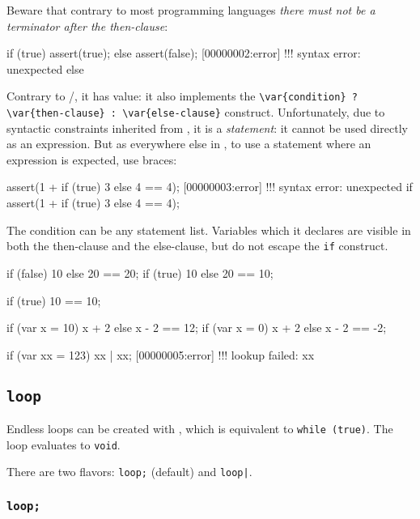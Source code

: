 Beware that contrary to most programming languages \emph{there must not be a
  terminator after the then-clause}:

\begin{urbiscript}
if (true)
  assert(true);
else
  assert(false);
[00000002:error] !!! syntax error: unexpected else
\end{urbiscript}

Contrary to \langC/\Cxx, it has value: it also implements the
\lstinline|\var{condition} ? \var{then-clause} : \var{else-clause}|
construct.  Unfortunately, due to syntactic constraints inherited from \langC,
it is a \emph{statement}: it cannot be used directly as an expression.  But
as everywhere else in \us, to use a statement where an expression is
expected, use braces:

\begin{urbiscript}
assert(1 + if (true) 3 else 4 == 4);
[00000003:error] !!! syntax error: unexpected if
assert(1 + { if (true) 3 else 4 } == 4);
\end{urbiscript}

The condition can be any statement list.  Variables which it declares are
visible in both the then-clause and the else-clause, but do not escape the
\lstinline{if} construct.

\begin{urbiassert}
{if (false) 10 else 20} == 20;
{if (true)  10 else 20} == 10;

{if (true) 10         } == 10;

{if (var x = 10) x + 2 else x - 2} == 12;
{if (var x = 0)  x + 2 else x - 2} == -2;

{if (var xx = 123) xx | xx};
[00000005:error] !!! lookup failed: xx
\end{urbiassert}


\subsection{\lstinline{loop}}
\label{sec:lang:loop}

Endless loops can be created with , which is equivalent to
\lstinline|while (true)|.  The loop evaluates to \lstinline{void}.



There are two flavors: \lstinline{loop;} (default) and \lstinline{loop|}.

\subsubsection{\lstinline{loop;}}
\label{sec:lang:loop:semi}

